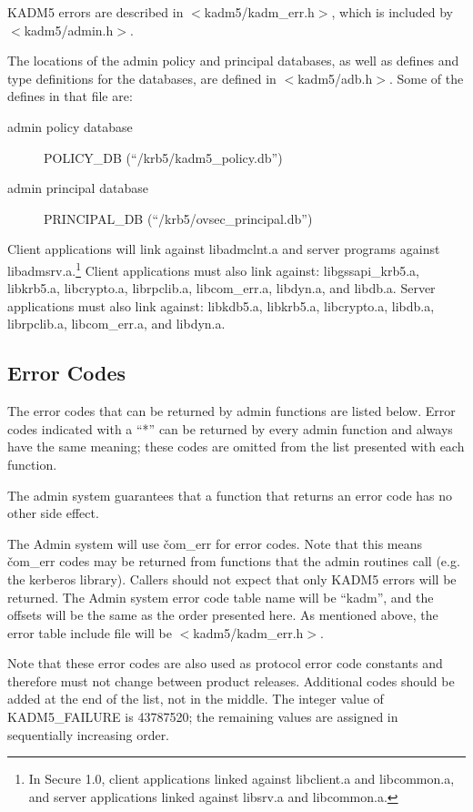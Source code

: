 KADM5 errors are described in $<$kadm5/kadm_err.h$>$, which
is included by $<$kadm5/admin.h$>$.

The locations of the admin policy and principal databases, as well as
defines and type definitions for the databases, are defined in
$<$kadm5/adb.h$>$.  Some of the defines in that file are:
\begin{description}
\item[admin policy database] POLICY_DB (``/krb5/kadm5_policy.db'')
\item[admin principal database] PRINCIPAL_DB (``/krb5/ovsec_principal.db'')
\end{description}

Client applications will link against libadmclnt.a and server programs
against libadmsrv.a.\footnote{In Secure 1.0, client applications
linked against libclient.a and libcommon.a, and server applications
linked against libsrv.a and libcommon.a.}  Client applications must
also link against: libgssapi_krb5.a, libkrb5.a, libcrypto.a,
librpclib.a, libcom_err.a, libdyn.a, and libdb.a.  Server applications
must also link against: libkdb5.a, libkrb5.a, libcrypto.a, libdb.a,
librpclib.a, libcom_err.a, and libdyn.a.

\subsection{Error Codes}

The error codes that can be returned by admin functions are listed
below.  Error codes indicated with a ``*'' can be returned by every
admin function and always have the same meaning; these codes are
omitted from the list presented with each function.  

The admin system guarantees that a function that returns an error code
has no other side effect.

The Admin system will use \v{com_err} for error codes.  Note that this
means \v{com_err} codes may be returned from functions that the admin
routines call (e.g. the kerberos library). Callers should not expect
that only KADM5 errors will be returned.  The Admin system error code
table name will be ``kadm'', and the offsets will be the same as the
order presented here. As mentioned above, the error table include file
will be $<$kadm5/kadm_err.h$>$.

Note that these error codes are also used as protocol error code
constants and therefore must not change between product releases.
Additional codes should be added at the end of the list, not in the
middle.  The integer value of KADM5_FAILURE is 43787520; the
remaining values are assigned in sequentially increasing order.

